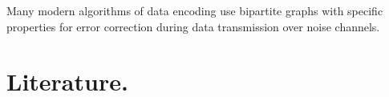 \documentclass[a4paper,fleqn]{cas-sc}
\begin{document}

\renewcommand{\mod}[1]{\textrm{mod}\ #1}




Many modern algorithms of data encoding use bipartite graphs with specific properties for error correction during data transmission over noise channels.

\section{Literature.}

\end{document}

